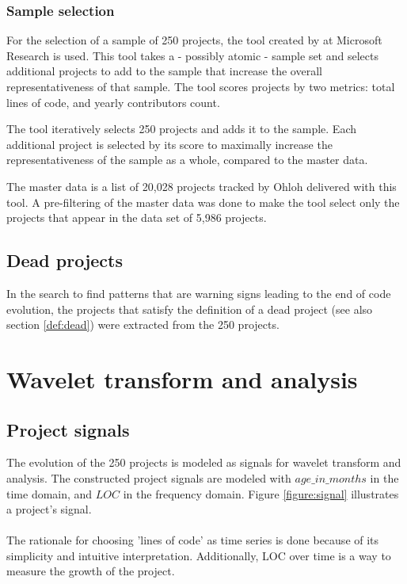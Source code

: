 \subsubsection{Sample selection}
For the selection of a sample of 250 projects, the tool created by
\citet{nagappan} at Microsoft Research is used. This tool takes a - possibly
atomic - sample set and selects additional projects to add to the sample that
increase the overall representativeness of that sample. The tool scores
projects by two metrics: total lines of code, and yearly contributors count.

The tool iteratively selects 250 projects and adds it to the sample. Each
additional project is selected by its score to maximally increase the
representativeness of the sample as a whole, compared to the master data.

The master data is a list of 20,028 projects tracked by Ohloh delivered with
this tool. A pre-filtering of the master data was done to make the tool select
only the projects that appear in the data set of 5,986 projects.

\subsection{Dead projects}
In the search to find patterns that are warning signs leading to the end of
code evolution, the projects that satisfy the definition of a dead project (see
also section \ref{def:dead}) were extracted from the 250 projects.

\section{Wavelet transform and analysis}
\subsection{Project signals}
\label{section:signals}
The evolution of the 250 projects is modeled as signals for wavelet transform
and analysis. The constructed project signals are modeled with
$age\_in\_months$ in the time domain, and $LOC$ in the frequency domain. Figure
\ref{figure:signal} illustrates a project's signal.



\paragraph{}
The rationale for choosing 'lines of code' as time series is done because of
its simplicity and intuitive interpretation. Additionally, LOC over time is a
way to measure the growth of the project.


